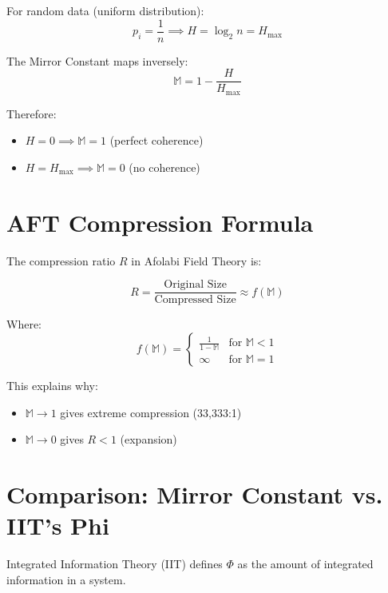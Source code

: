 \documentclass[12pt,a4paper]{article}
\begin{document}
For random data (uniform distribution):
\begin{equation}
p_i = \frac{1}{n} \implies H = \log_2 n = H_{\max}
\end{equation}

The Mirror Constant maps inversely:
\begin{equation}
\mathbb{M} = 1 - \frac{H}{H_{\max}}
\end{equation}

Therefore:
\begin{itemize}
    \item $H = 0 \implies \mathbb{M} = 1$ (perfect coherence)
    \item $H = H_{\max} \implies \mathbb{M} = 0$ (no coherence)
\end{itemize}

\section{AFT Compression Formula}

The compression ratio $R$ in Afolabi Field Theory is:

\begin{equation}
R = \frac{\text{Original Size}}{\text{Compressed Size}} \approx f(\mathbb{M})
\end{equation}

Where:
\begin{equation}
f(\mathbb{M}) = \begin{cases}
\frac{1}{1 - \mathbb{M}} & \text{for } \mathbb{M} < 1 \\
\infty & \text{for } \mathbb{M} = 1
\end{cases}
\end{equation}

This explains why:
\begin{itemize}
    \item $\mathbb{M} \rightarrow 1$ gives extreme compression (33,333:1)
    \item $\mathbb{M} \rightarrow 0$ gives $R < 1$ (expansion)
\end{itemize}

\section{Comparison: Mirror Constant vs. IIT's Phi}

Integrated Information Theory (IIT) defines $\Phi$ as the amount of integrated information in a system.
\end{document}
